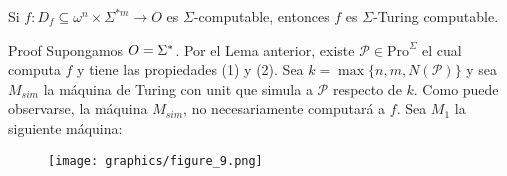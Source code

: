 \begin{frame}
  \begin{theorem}
    Si $f: D_{f} \subseteq \omega^{n} \times \Sigma^{\ast m} \rightarrow O$ es $\Sigma$-computable, entonces $f$ es
    $\Sigma$-Turing computable.
  \end{theorem}

  \begin{block}{Proof}
    \PN Supongamos $O = \Sigma^{\ast}$. Por el Lema anterior, existe $\mathcal{P} \in \mathrm{Pro}^{\Sigma}$ el cual computa
    $f$ y tiene las propiedades (1) y (2). Sea $k = \max \{n, m, N(\mathcal{P})\}$ y sea $M_{sim}$ la máquina de Turing
    con unit que simula a $\mathcal{P}$ respecto de $k$. Como puede observarse, la máquina $M_{sim}$, no necesariamente
    computará a $f$. Sea $M_{1}$ la siguiente máquina:
  \end{block}

  \begin{figure}[h]
    \centering
    \texttt{[image: graphics/figure\_9.png]}
  \end{figure}
\end{frame}
